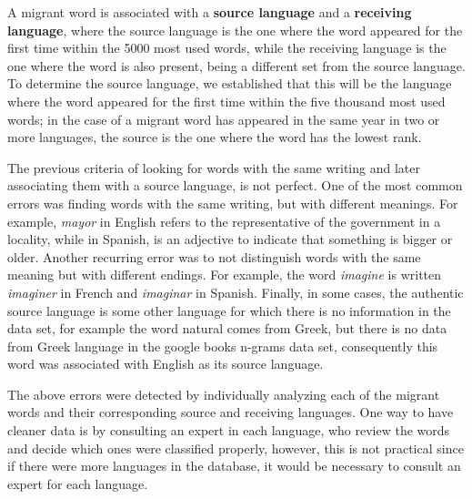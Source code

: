 \documentclass[10pt,letterpaper]{article} %
\begin{document}
A migrant word is associated with a \textbf{source language} and a
\textbf{receiving language}, where the source language is the one where the
word appeared for the first time within the 5000 most used words,
while the receiving language is the one where the word is also present, being a
different set from the source language.   To determine the source language, we
established that this will be the language where the word appeared for the
first time within the five thousand most used words; in the case of a migrant
word has appeared in the same year in two or more languages, the source is the
one where the word has the lowest rank.


The previous criteria of looking for words with the same writing and later
associating them with a source language, is not perfect. One of the most common
errors was finding words with the same writing, but with different meanings.
For example,  \textit{mayor} in English refers to the representative of the government in
a locality, while in Spanish,  is an adjective to indicate that something
is bigger or older.  Another recurring error was to not distinguish words with
the same meaning but with different endings. For example, the word \textit{imagine} is
written \textit{imaginer} in French and \textit{imaginar} in Spanish.  Finally, in some cases, the
authentic source language is some other language for which there is no
information in the data set, for example the word  natural comes from Greek,
but there is no data from Greek language in the google books n-grams data set,
consequently this word was associated with English as its source language.

The above errors were detected by individually analyzing each of the migrant
words and their corresponding source and receiving languages. One way to have
cleaner data is by consulting an expert in each language, who review the words
and decide which ones were classified properly, however, this is not practical
since if there were more languages in the database, it would be
necessary to consult an expert for each language.

\end{document}
